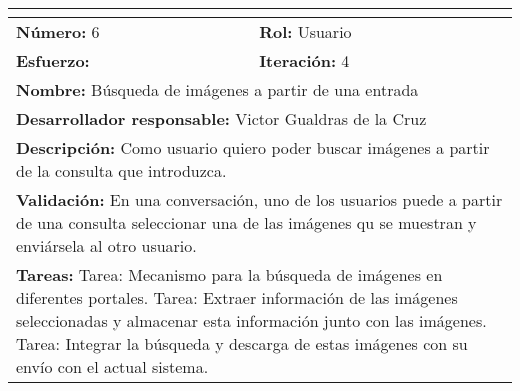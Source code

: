 \begin{tabular}{|p{} |p{} |}
\hline
\multicolumn{2}{|l|}{\cellcolor[HTML]{C0C0C0}{\textbf{Historia de usuario}}} \\ \hline
\textbf{Número:} 6           & \textbf{Rol:} Usuario          \\ \hline
\textbf{Esfuerzo:}           & \textbf{Iteración:} 4         \\ \hline
\multicolumn{2}{|p{0.8\textwidth}|}{\textbf{Nombre:} Búsqueda de imágenes a partir de una entrada} \\ \hline
\multicolumn{2}{|p{0.8\textwidth}|}{\textbf{Desarrollador responsable:} Victor Gualdras de la Cruz} \\ \hline
\multicolumn{2}{|p{0.8\textwidth}|}{\textbf{Descripción:}\newline
Como usuario quiero poder buscar imágenes a partir de la consulta que introduzca.} \\ \hline
\multicolumn{2}{|p{0.8\textwidth}|}{\textbf{Validación:}\newline
En una conversación, uno de los usuarios puede a partir de una consulta seleccionar una de las imágenes qu se muestran y enviársela al otro usuario.
} \\ \hline
\multicolumn{2}{|p{0.8\textwidth}|}{\textbf{Tareas:}\newline
Tarea: Mecanismo para la búsqueda de imágenes en diferentes portales.\newline
Tarea: Extraer información de las imágenes seleccionadas y almacenar esta información junto con las imágenes.\newline
Tarea: Integrar la búsqueda y descarga de estas imágenes con su envío con el actual sistema.} \\ \hline
\end{tabular}